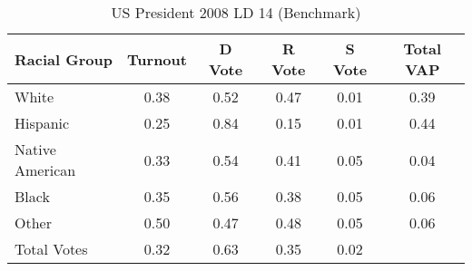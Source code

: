 \begin{table}[htb]
\begin{center}
\caption{US President 2008 LD 14 (Benchmark)}
\label{pres08_vap_ld_14_benchmark}
\begin{tabular}{lccccc}
  \hline
Racial Group & Turnout & D Vote & R Vote & S Vote & Total VAP \\ 
  \hline
White & 0.38 & 0.52 & 0.47 & 0.01 & 0.39 \\ 
  Hispanic & 0.25 & 0.84 & 0.15 & 0.01 & 0.44 \\ 
  Native American & 0.33 & 0.54 & 0.41 & 0.05 & 0.04 \\ 
  Black & 0.35 & 0.56 & 0.38 & 0.05 & 0.06 \\ 
  Other & 0.50 & 0.47 & 0.48 & 0.05 & 0.06 \\ 
  Total Votes & 0.32 & 0.63 & 0.35 & 0.02 &  \\ 
   \hline
\end{tabular}
\end{center}
\end{table}
